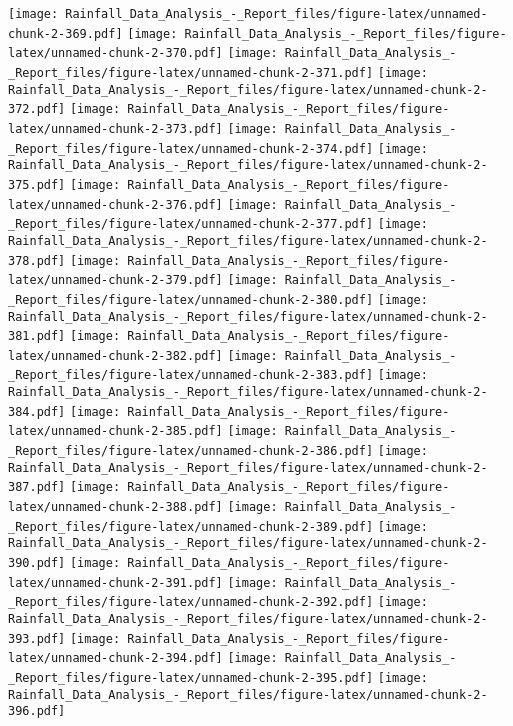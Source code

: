 \documentclass[
]{article}
\begin{document}
\texttt{[image: Rainfall\_Data\_Analysis\_-\_Report\_files/figure-latex/unnamed-chunk-2-369.pdf]}
\texttt{[image: Rainfall\_Data\_Analysis\_-\_Report\_files/figure-latex/unnamed-chunk-2-370.pdf]}
\texttt{[image: Rainfall\_Data\_Analysis\_-\_Report\_files/figure-latex/unnamed-chunk-2-371.pdf]}
\texttt{[image: Rainfall\_Data\_Analysis\_-\_Report\_files/figure-latex/unnamed-chunk-2-372.pdf]}
\texttt{[image: Rainfall\_Data\_Analysis\_-\_Report\_files/figure-latex/unnamed-chunk-2-373.pdf]}
\texttt{[image: Rainfall\_Data\_Analysis\_-\_Report\_files/figure-latex/unnamed-chunk-2-374.pdf]}
\texttt{[image: Rainfall\_Data\_Analysis\_-\_Report\_files/figure-latex/unnamed-chunk-2-375.pdf]}
\texttt{[image: Rainfall\_Data\_Analysis\_-\_Report\_files/figure-latex/unnamed-chunk-2-376.pdf]}
\texttt{[image: Rainfall\_Data\_Analysis\_-\_Report\_files/figure-latex/unnamed-chunk-2-377.pdf]}
\texttt{[image: Rainfall\_Data\_Analysis\_-\_Report\_files/figure-latex/unnamed-chunk-2-378.pdf]}
\texttt{[image: Rainfall\_Data\_Analysis\_-\_Report\_files/figure-latex/unnamed-chunk-2-379.pdf]}
\texttt{[image: Rainfall\_Data\_Analysis\_-\_Report\_files/figure-latex/unnamed-chunk-2-380.pdf]}
\texttt{[image: Rainfall\_Data\_Analysis\_-\_Report\_files/figure-latex/unnamed-chunk-2-381.pdf]}
\texttt{[image: Rainfall\_Data\_Analysis\_-\_Report\_files/figure-latex/unnamed-chunk-2-382.pdf]}
\texttt{[image: Rainfall\_Data\_Analysis\_-\_Report\_files/figure-latex/unnamed-chunk-2-383.pdf]}
\texttt{[image: Rainfall\_Data\_Analysis\_-\_Report\_files/figure-latex/unnamed-chunk-2-384.pdf]}
\texttt{[image: Rainfall\_Data\_Analysis\_-\_Report\_files/figure-latex/unnamed-chunk-2-385.pdf]}
\texttt{[image: Rainfall\_Data\_Analysis\_-\_Report\_files/figure-latex/unnamed-chunk-2-386.pdf]}
\texttt{[image: Rainfall\_Data\_Analysis\_-\_Report\_files/figure-latex/unnamed-chunk-2-387.pdf]}
\texttt{[image: Rainfall\_Data\_Analysis\_-\_Report\_files/figure-latex/unnamed-chunk-2-388.pdf]}
\texttt{[image: Rainfall\_Data\_Analysis\_-\_Report\_files/figure-latex/unnamed-chunk-2-389.pdf]}
\texttt{[image: Rainfall\_Data\_Analysis\_-\_Report\_files/figure-latex/unnamed-chunk-2-390.pdf]}
\texttt{[image: Rainfall\_Data\_Analysis\_-\_Report\_files/figure-latex/unnamed-chunk-2-391.pdf]}
\texttt{[image: Rainfall\_Data\_Analysis\_-\_Report\_files/figure-latex/unnamed-chunk-2-392.pdf]}
\texttt{[image: Rainfall\_Data\_Analysis\_-\_Report\_files/figure-latex/unnamed-chunk-2-393.pdf]}
\texttt{[image: Rainfall\_Data\_Analysis\_-\_Report\_files/figure-latex/unnamed-chunk-2-394.pdf]}
\texttt{[image: Rainfall\_Data\_Analysis\_-\_Report\_files/figure-latex/unnamed-chunk-2-395.pdf]}
\texttt{[image: Rainfall\_Data\_Analysis\_-\_Report\_files/figure-latex/unnamed-chunk-2-396.pdf]}
\end{document}
